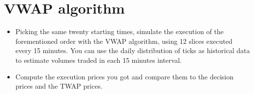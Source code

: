 \section{VWAP algorithm}

\begin{itemize}
    \item Picking the same twenty starting times, simulate the execution of the forementioned order with the VWAP algorithm, using 12 slices executed every 15 minutes. You can use the daily distribution of ticks as historical data to estimate volumes traded in each 15 minutes interval. 
    \item Compute the execution prices you got and compare them to the decision prices and the TWAP prices.
\end{itemize}



